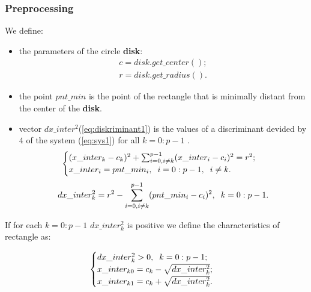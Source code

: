 \documentclass{report}
\begin{document}
		\subsubsection*{Preprocessing}
		We define:
		\begin{itemize}
			\item the parameters of the circle {\bfseries disk}:
			\begin{equation}
				\begin{gathered}
				c = disk.get\_center();\\
				r = disk.get\_radius().
				\label{eq:paramdisk}
				\end{gathered}
			\end{equation}
			\item the point $pnt\_min$ is the point of the rectangle that is  minimally distant from the center of the {\bfseries disk}.
			\item vector $dx\_inter^2$(\ref{eq:diskriminant1}) is the values of a discriminant devided by  $4$ of the system (\ref{eq:sys1}) for all $k = 0:p-1$ .
			\begin{equation}
				\begin{cases}
				(x\_inter_k - c_k)^2 + \sum_{i=0, i \neq k}^{p-1} (x\_inter_i - c_i)^2 = r^2;\\ 
				x\_inter_i = pnt\_min_i,\hspace*{2mm} i = 0:p-1, \hspace*{2mm}i \neq k.
				\end{cases}
				\label{eq:sys1}
			\end{equation}
			\begin{equation}
				\begin{gathered}
				dx\_inter_k^2 = r^2 - \sum_{i=0, i \neq k}^{p-1} (pnt\_min_i - c_i)^2, \hspace*{2mm} k = 0:p-1.\\
				\label{eq:diskriminant1}
				\end{gathered}
			\end{equation}
		\end{itemize}
		If for each $k = 0:p-1$ $dx\_inter_k^2$ is positive we define the characteristics of rectangle as: 
	
		\begin{equation}
		\begin{cases}
			dx\_inter_k^2 > 0, \hspace*{2mm} k = 0:p-1;\\ 
			x\_inter_{k0} = c_k - \sqrt {dx\_inter_k^2};\\
			x\_inter_{k1} = c_k + \sqrt {dx\_inter_k^2}.
			\label{eq:l1l2}
		\end{cases}
		\end{equation}
	
\end{document}
